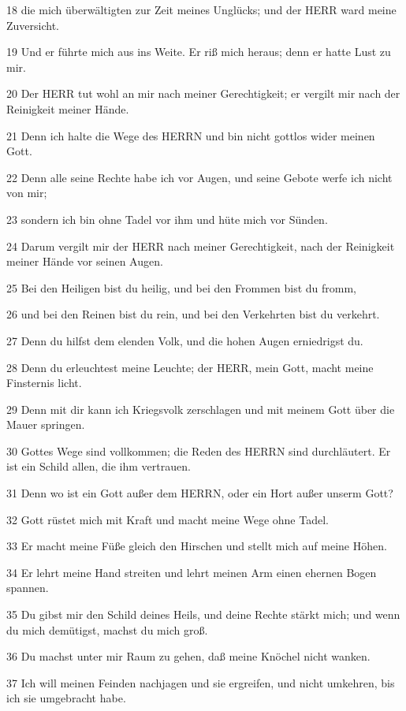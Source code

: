 \par 18 die mich überwältigten zur Zeit meines Unglücks; und der HERR ward meine Zuversicht.
\par 19 Und er führte mich aus ins Weite. Er riß mich heraus; denn er hatte Lust zu mir.
\par 20 Der HERR tut wohl an mir nach meiner Gerechtigkeit; er vergilt mir nach der Reinigkeit meiner Hände.
\par 21 Denn ich halte die Wege des HERRN und bin nicht gottlos wider meinen Gott.
\par 22 Denn alle seine Rechte habe ich vor Augen, und seine Gebote werfe ich nicht von mir;
\par 23 sondern ich bin ohne Tadel vor ihm und hüte mich vor Sünden.
\par 24 Darum vergilt mir der HERR nach meiner Gerechtigkeit, nach der Reinigkeit meiner Hände vor seinen Augen.
\par 25 Bei den Heiligen bist du heilig, und bei den Frommen bist du fromm,
\par 26 und bei den Reinen bist du rein, und bei den Verkehrten bist du verkehrt.
\par 27 Denn du hilfst dem elenden Volk, und die hohen Augen erniedrigst du.
\par 28 Denn du erleuchtest meine Leuchte; der HERR, mein Gott, macht meine Finsternis licht.
\par 29 Denn mit dir kann ich Kriegsvolk zerschlagen und mit meinem Gott über die Mauer springen.
\par 30 Gottes Wege sind vollkommen; die Reden des HERRN sind durchläutert. Er ist ein Schild allen, die ihm vertrauen.
\par 31 Denn wo ist ein Gott außer dem HERRN, oder ein Hort außer unserm Gott?
\par 32 Gott rüstet mich mit Kraft und macht meine Wege ohne Tadel.
\par 33 Er macht meine Füße gleich den Hirschen und stellt mich auf meine Höhen.
\par 34 Er lehrt meine Hand streiten und lehrt meinen Arm einen ehernen Bogen spannen.
\par 35 Du gibst mir den Schild deines Heils, und deine Rechte stärkt mich; und wenn du mich demütigst, machst du mich groß.
\par 36 Du machst unter mir Raum zu gehen, daß meine Knöchel nicht wanken.
\par 37 Ich will meinen Feinden nachjagen und sie ergreifen, und nicht umkehren, bis ich sie umgebracht habe.
